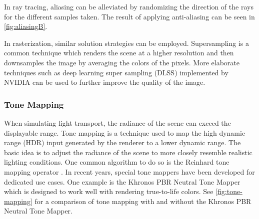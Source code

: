 In ray tracing, aliasing can be alleviated by randomizing the direction of the rays for the different samples taken. The result of applying anti-aliasing can be seen in \autoref{fig:aliasingB}.

In rasterization, similar solution strategies can be employed. Supersampling is a common technique which renders the scene at a higher resolution and then downsamples the image by averaging the colors of the pixels. More elaborate techniques such as deep learning super sampling (DLSS) implemented by NVIDIA \cite{nvidiaDlss} can be used to further improve the quality of the image.

\subsubsection{Tone Mapping}
\label{sec:toneMappingTheory}

When simulating light transport, the radiance of the scene can exceed the displayable range. Tone mapping is a technique used to map the high dynamic range (\gls{HDR}) input generated by the renderer to a lower dynamic range. The basic idea is to adjust the radiance of the scene to more closely resemble realistic lighting conditions. One common algorithm to do so is the Reinhard tone mapping operator \cite{reinhardToneMapping}. In recent years, special tone mappers have been developed for dedicated use cases. One example is the Khronos PBR Neutral Tone Mapper \cite{pbrNeutralToneMapping} which is designed to work well with rendering true-to-life colors. See \autoref{fig:tone-mapping} for a comparison of tone mapping with and without the Khronos PBR Neutral Tone Mapper.

